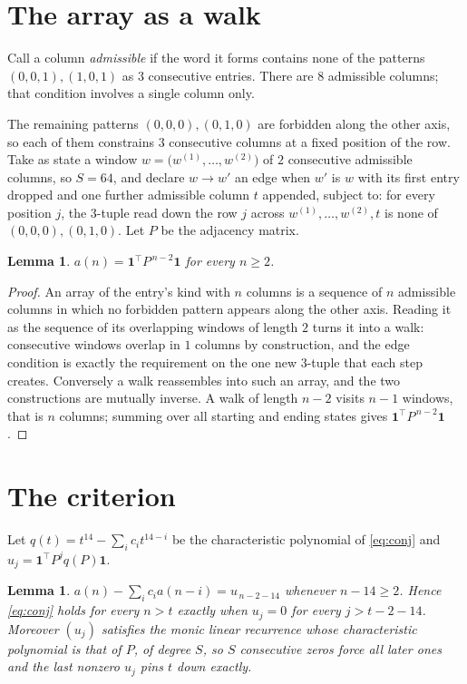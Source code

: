 \documentclass[11pt,a4paper]{article}
\theoremstyle{plain}
\newtheorem{lemma}[theorem]{Lemma}
\theoremstyle{definition}
\begin{document}
\section{The array as a walk}

Call a column \emph{admissible} if the word it forms contains none of the patterns
$(0,0,1), (1,0,1)$ as $3$ consecutive entries. There are $8$ admissible columns; that condition
involves a single column only.

The remaining patterns $(0,0,0), (0,1,0)$ are forbidden along the other axis, so each of them
constrains $3$ consecutive columns at a fixed position of the row. Take as state a
window $w=\bigl(w^{(1)},\dots,w^{(2)}\bigr)$ of $2$ consecutive admissible
columns, so $S=64$, and declare $w\to w'$ an edge when $w'$ is $w$ with its first entry
dropped and one further admissible column $t$ appended, subject to: for every position
$j$, the $3$-tuple read down the row $j$ across $w^{(1)},\dots,w^{(2)},t$
is none of $(0,0,0), (0,1,0)$. Let $P$ be the adjacency matrix.

\begin{lemma}\label{lem:walk}
$a(n)=\mathbf{1}^{\!\top}P^{\,n-2}\mathbf{1}$ for every $n\ge2$.
\end{lemma}

\begin{proof}
An array of the entry's kind with $n$ columns is a sequence of $n$ admissible columns in
which no forbidden pattern appears along the other axis. Reading it as the sequence of its
overlapping windows of length $2$ turns it into a walk: consecutive windows overlap in
$1$ columns by construction, and the edge condition is exactly the requirement on the one
new $3$-tuple that each step creates. Conversely a walk reassembles into such an array,
and the two constructions are mutually inverse. A walk of length $n-2$ visits $n-1$
windows, that is $n$ columns; summing over all starting and ending states gives
$\mathbf{1}^{\!\top}P^{\,n-2}\mathbf{1}$.
\end{proof}

\section{The criterion}

Let $q(t)=t^{14}-\sum_i c_i t^{14-i}$ be the characteristic polynomial of
\eqref{eq:conj} and $u_j=\mathbf{1}^{\!\top}P^{j}q(P)\mathbf{1}$.

\begin{lemma}\label{lem:crit}
$a(n)-\sum_i c_i a(n-i)=u_{\,n-2-14}$ whenever $n-14\ge2$. Hence
\eqref{eq:conj} holds for every $n>t$ exactly when $u_j=0$ for every
$j>t-2-14$. Moreover $(u_j)$ satisfies the monic linear recurrence whose
characteristic polynomial is that of $P$, of degree $S$, so $S$ consecutive zeros force all
later ones and the last nonzero $u_j$ pins $t$ down exactly.
\end{lemma}
\end{document}
